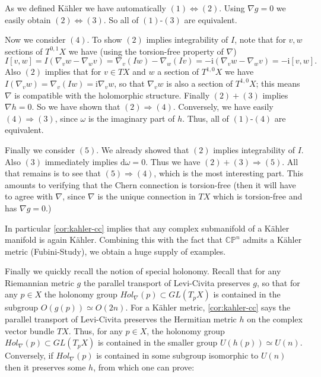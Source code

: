 \documentclass[12pt,letterpaper,reqno]{amsart}
\numberwithin{equation}{section}
\newcommand{\C}{\ensuremath{\mathbb C}}
\newcommand{\PP}{\ensuremath{\mathbb P}}
\newcommand{\kahler}{K\"ahler\xspace}
\newcommand{\I}{{\mathrm i}}
\newcommand{\de}{\mathrm{d}}
\newcommand{\fixme}[1]{{\color{blue}{[#1]}}}
\begin{document}
\begin{pf} As we defined \kahler we have 
automatically $(1) \Leftrightarrow (2)$. 
Using $\nabla g = 0$ we easily obtain $(2) \Leftrightarrow (3)$.
So all of $(1)$-$(3)$ are equivalent.

Now we consider $(4)$.
To show $(2)$ implies integrability of $I$,
note that for $v,w$ sections of $T^{0,1} X$ we have
(using the torsion-free property of $\nabla$)
\begin{equation}
  I[v,w] = I(\nabla_v w - \nabla_w v) = \nabla_v(Iw) - \nabla_w(Iv) = -\I (\nabla_v w - \nabla_w v) = -\I [v,w].
\end{equation}
Also $(2)$ implies that
for $v \in TX$ and $w$ a section of $T^{1,0} X$
we have $I (\nabla_v w) = \nabla_v (Iw) = \I \nabla_v w$,
so that $\nabla_v w$ is also a section of $T^{1,0} X$;
this means $\nabla$ is compatible with the holomorphic
structure.
Finally $(2)+(3)$ implies $\nabla h = 0$.
So we have shown that $(2) \Rightarrow (4)$.
Conversely, we have easily $(4) \Rightarrow (3)$,
since $\omega$ is the imaginary part of $h$.
Thus, all of $(1)$-$(4)$ are equivalent.

Finally we consider $(5)$. We already showed that
$(2)$ implies integrability of $I$. Also
$(3)$ immediately implies $\de \omega = 0$.
Thus we have $(2)+(3) \Rightarrow (5)$.
All that remains is to see that $(5) \Rightarrow (4)$,
which is the most interesting part. This amounts to verifying
that the Chern connection is torsion-free (then it will have
to agree with $\nabla$, since $\nabla$ is the unique connection
in $TX$ which is torsion-free and has $\nabla g = 0$.) \fixme{...}
\end{pf}




In particular \autoref{cor:kahler-cc} implies that any complex 
submanifold of a \kahler manifold is again \kahler. Combining this 
with the fact that $\C\PP^n$ admits a \kahler metric
(Fubini-Study), we obtain a huge supply of examples.

Finally we quickly recall the notion of special holonomy. Recall that for any Riemannian metric $g$ the parallel transport of Levi-Civita preserves $g$, so that 
for any $p \in X$ the holonomy group $Hol_\nabla(p) \subset GL(T_p X)$ 
is contained in the subgroup $O(g(p)) \simeq O(2n)$.
For a \kahler metric, \autoref{cor:kahler-cc} says
the parallel transport of Levi-Civita preserves the Hermitian metric
$h$ on the complex vector bundle $TX$. Thus, for any $p \in X$, the holonomy group
$Hol_\nabla(p) \subset GL(T_p X)$ is contained in the smaller group $U(h(p)) \simeq U(n)$.
Conversely, if $Hol_\nabla(p)$ is contained in some subgroup 
isomorphic to $U(n)$ then it preserves some $h$, from 
which one can prove:
\end{document}
